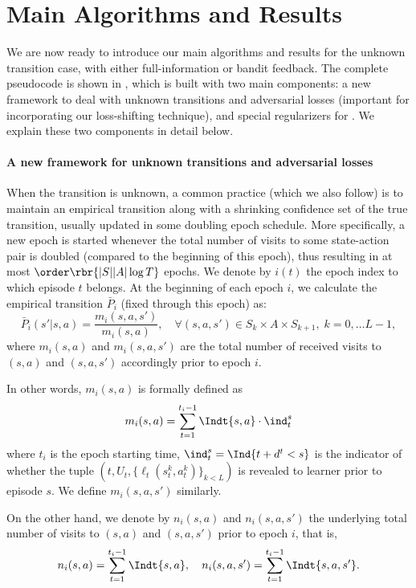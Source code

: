 \section{Main Algorithms and Results}\label{sec:algorithms}




We are now ready to introduce our main algorithms and results for the unknown transition case, with either full-information or bandit feedback.
The complete pseudocode is shown in ,
which is built with two main components: a new framework to deal with unknown transitions and adversarial losses (important for incorporating our loss-shifting technique), and special regularizers for \ftrl.
We explain these two components in detail below.

\paragraph{A new framework for unknown transitions and adversarial losses}
When the transition is unknown, a common practice (which we also follow) is to maintain an empirical transition along with a shrinking confidence set of the true transition, usually updated in some doubling epoch schedule.
More specifically, a new epoch is started whenever the total number of visits to some state-action pair is doubled (compared to the beginning of this epoch), thus resulting in at most $\order\rbr{|S||A|\log T}$ epochs.
We denote by $i(t)$ the epoch index to which episode $t$ belongs. 
At the beginning of each epoch $i$, we calculate the empirical transition $\bar{P}_i$ (fixed through this epoch) as: 
\begin{equation}
\label{eq:empirical_mean_transition_def} 
\bar{P}_i(s'|s,a) = \frac{ m_i(s,a,s')  }{m_i(s,a)}, \quad \forall (s,a,s') \in S_k \times A \times S_{k+1}, \; k = 0,\ldots L-1, 
\end{equation}
where $m_i(s,a)$ and $m_i(s,a,s')$ are the total number of received visits to $(s,a)$ and $(s,a,s')$ accordingly prior to epoch $i$. 
{\color{magenta}
In other words, $m_i(s,a)$ is formally defined as 
\[
m_i(s,a) = \sum_{t=1}^{t_i - 1} \Indt{s,a} \cdot \ind_t^s  
\]
where $t_i$ is the epoch starting time, $\ind_t^s = \Ind{ t + d^t < s  }$ is the indicator of whether the tuple $(t, U_t, \{\ell_t(s_t^k, a_t^k)\}_{k<L})$ is revealed to learner prior to episode $s$.  We define  $m_i(s,a,s')$ similarly. 

On the other hand, we denote by $n_i(s,a)$ and $n_i(s,a,s')$ the underlying total number of visits to $(s,a)$ and $(s,a,s')$ prior to epoch $i$, that is, 
\[
n_i(s,a) = \sum_{t=1}^{t_i - 1} \Indt{s,a}, \quad n_i(s,a,s') = \sum_{t=1}^{t_i - 1} \Indt{s,a,s'}. 
\]
} 

